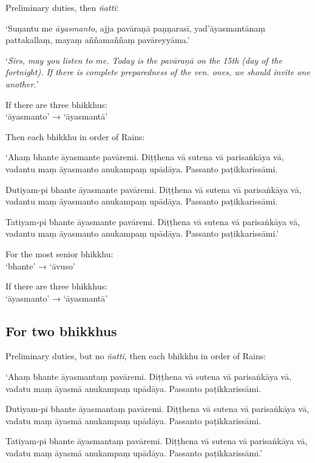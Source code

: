 Preliminary duties, then \emph{ñatti}:

\vspace*{\parskip}

\begin{paritta}
‘Suṇantu me \emph{āyasmanto}, ajja pavāraṇā paṇṇarasī, yad'āyasmantānaṃ
pattakallaṃ, mayaṃ aññamaññaṃ pavāreyyāma.’
\end{paritta}

‘\emph{Sirs, may you listen to me. Today is the pavāraṇā on the 15th (day of the
fortnight). If there is complete preparedness of the ven. ones, we should
invite one another.}’


If there are three bhikkhus:\\
‘āyasmanto’ → ‘āyasmantā’

Then each bhikkhu in order of Rains:

\vspace*{\parskip}

\begin{paritta}
‘Ahaṃ bhante āyasmante pavāremi. Diṭṭhena vā sutena vā parisaṅkāya vā, vadantu
maṃ āyasmanto anukampaṃ upādāya. Passanto paṭikkarissāmi.

Dutiyam-pi bhante āyasmante pavāremi. Diṭṭhena vā sutena vā parisaṅkāya vā,
vadantu maṃ āyasmanto anukampaṃ upādāya. Passanto paṭikkarissāmi.

Tatiyam-pi bhante āyasmante pavāremi. Diṭṭhena vā sutena vā parisaṅkāya vā,
vadantu maṃ āyasmanto anukampaṃ upādāya. Passanto paṭikkarissāmi.’
\end{paritta}

For the most senior bhikkhu:\\
‘bhante’ → ‘āvuso’

If there are three bhikkhus:\\
‘āyasmanto’ → ‘āyasmantā’

\subsection{For two bhikkhus}

Preliminary duties, but no \emph{ñatti}, then each bhikkhu in order of Rains:

\vspace*{\parskip}

\begin{paritta}
‘Ahaṃ bhante āyasmantaṃ pavāremi. Diṭṭhena vā sutena vā parisaṅkāya vā, vadatu
maṃ āyasmā anukampaṃ upādāya. Passanto paṭikkarissāmi.

Dutiyam-pi bhante āyasmantaṃ pavāremi. Diṭṭhena vā sutena vā parisaṅkāya vā,
vadatu maṃ āyasmā anukampaṃ upādāya. Passanto paṭikkarissāmi.

Tatiyam-pi bhante āyasmantaṃ pavāremi. Diṭṭhena vā sutena vā parisaṅkāya vā,
vadatu maṃ āyasmā anukampaṃ upādāya. Passanto paṭikkarissāmi.’
\end{paritta}

